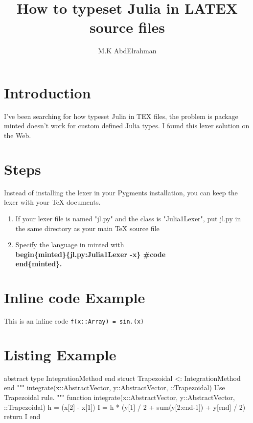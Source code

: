 \documentclass[a4paper,11pt]{scrartcl}
\begin{document}
	\title{How to typeset  Julia in LATEX source files }
	\date{}
	\author{M.K AbdElrahman}
	\maketitle

\newcommand{\jlinline}[1]{\texttt{#1}}


\section{Introduction}
I've been searching for how typeset  Julia in TEX files, the problem is package  minted doesn't work for custom defined Julia types. I found this lexer solution on the Web.  
\section{Steps}	
Instead of installing the lexer in your Pygments installation, you can keep the lexer with your TeX documents.	
\begin{enumerate}
	 \item  If your lexer file is named "jl.py" and the class is "Julia1Lexer", put jl.py in the same directory as your main TeX source file
	 \item Specify the language in minted with \textbf{ \\begin\{minted\}\{jl.py:Julia1Lexer -x\}  \#code
	 	\\end\{minted\}.}
\end{enumerate}
\section{Inline code Example}
This is an inline code \jlinline{f(x::Array) = sin.(x)}
\section{Listing Example}
\begin{jl}
	abstract type IntegrationMethod end
	struct Trapezoidal <: IntegrationMethod end
	"""
	integrate(x::AbstractVector, y::AbstractVector, ::Trapezoidal)
	Use Trapezoidal rule.
	"""
	function integrate(x::AbstractVector, y::AbstractVector, ::Trapezoidal)
		h = (x[2] - x[1])
		I = h * (y[1] / 2 + sum(y[2:end-1]) + y[end] / 2)
		return I
	end
	
\end{jl}
\end{document}
